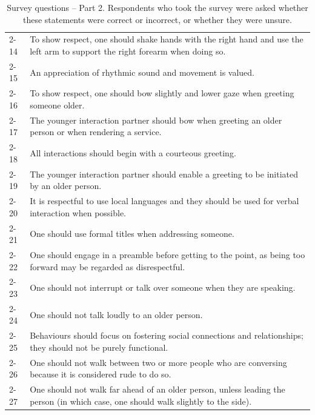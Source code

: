 \documentclass{CSSRforAfrica}
\begin{document}
\begin{table}[H]
\begin{center}
\begin{tabularx}{\linewidth}{|l|X|}
 {\small 2-14 }   & {\small  To show respect, one should shake hands with the right hand and use the left arm to support the right forearm when doing so.}\\
 {\small 2-15}   & {\small  An appreciation of rhythmic sound and movement is valued. }\\
 {\small 2-16 }   & {\small  To show respect, one should bow slightly and lower gaze when greeting someone older.}\\
 {\small 2-17 }   & {\small  The younger interaction partner should bow when greeting an older person or when rendering a service.}\\
 {\small 2-18 }    & {\small  All interactions should begin with a courteous greeting.}\\
 {\small 2-19 }   & {\small  The younger interaction partner should enable a greeting to be initiated by an older person.}\\
 {\small 2-20 }   & {\small  It is respectful to use local languages and they should be used for verbal interaction when possible. }\\
 {\small 2-21 }   & {\small  One should use formal titles when addressing someone.}\\
 {\small 2-22 }    & {\small  One should engage in a preamble before getting to the point, as being too forward may be regarded as disrespectful.}\\
 {\small 2-23 }   & {\small  One should not interrupt or talk over someone when they are speaking. }\\
 {\small 2-24 }   & {\small  One should not talk loudly to an older person.}\\
 {\small 2-25}   & {\small  Behaviours should focus on fostering social connections and relationships; they should not be purely functional.}\\ 
 {\small 2-26 }    & {\small  One should not walk between two or more people who are conversing because it is considered rude to do so.}\\
 {\small 2-27}   & {\small  One should not walk far ahead of an older person, unless leading the person (in which case, one should walk slightly to the side). }\\
\hline \hline
\end{tabularx}
\end{center}
\caption{Survey questions -- Part 2.  Respondents who took the survey were asked whether these statements were correct or incorrect, or whether they were unsure. }
\label{table:questions2}
\end{table}
\end{document}
